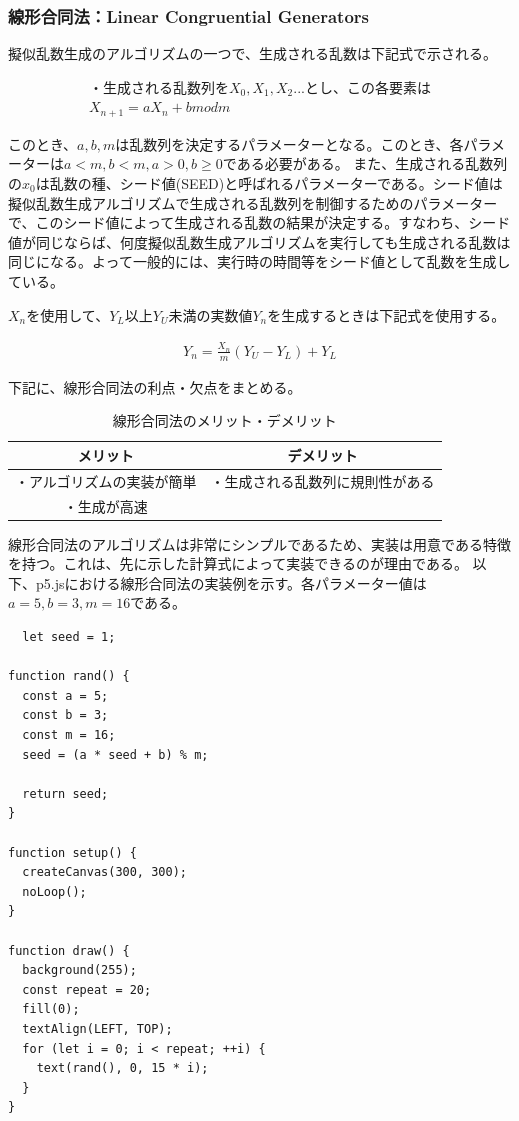 \documentclass[dvipdfmx]{jsarticle}
\begin{document}
\subsubsection{線形合同法：Linear Congruential Generators}
擬似乱数生成のアルゴリズムの一つで、生成される乱数は下記式で示される。
\begin{center}
  \begin{align*}
    ・生成される乱数列をX_{0}, X_{1}, X_{2}...とし、この各要素は\\
    X_{n+1} = aX_{n} + b mod m
  \end{align*}
\end{center}
このとき、$a, b, m$は乱数列を決定するパラメーターとなる。このとき、各パラメーターは$a < m, b < m, a > 0, b \geq 0$である必要がある。
また、生成される乱数列の$x_{0}$は乱数の種、シード値(SEED)と呼ばれるパラメーターである。シード値は擬似乱数生成アルゴリズムで生成される乱数列を制御するためのパラメーターで、このシード値によって生成される乱数の結果が決定する。すなわち、シード値が同じならば、何度擬似乱数生成アルゴリズムを実行しても生成される乱数は同じになる。よって一般的には、実行時の時間等をシード値として乱数を生成している。\par
$X_{n}$を使用して、$Y_{L}以上Y_{U}未満の実数値Y_{n}$を生成するときは下記式を使用する。
\begin{center}
  \begin{align*}
    Y_{n} = \frac{X_{n}}{m}(Y_{U}-Y_{L})+Y_{L}
  \end{align*}
\end{center}
下記に、線形合同法の利点・欠点をまとめる。
\begin{table}[H]
  \begin{center}
    \caption{線形合同法のメリット・デメリット}
    \begin{tabular}{|c|c|} \hline
      メリット & デメリット \\ \hline
      ・アルゴリズムの実装が簡単 & ・生成される乱数列に規則性がある\\
      ・生成が高速 & \\ \hline
    \end{tabular}
    \label{hyo01}
  \end{center}
\end{table}
線形合同法のアルゴリズムは非常にシンプルであるため、実装は用意である特徴を持つ。これは、先に示した計算式によって実装できるのが理由である。
以下、p5.jsにおける線形合同法の実装例を示す。各パラメーター値は$a = 5, b = 3, m = 16$である。
\begin{verbatim}
  let seed = 1;

function rand() {
  const a = 5;
  const b = 3;
  const m = 16;
  seed = (a * seed + b) % m;

  return seed;
}

function setup() {
  createCanvas(300, 300);
  noLoop();
}

function draw() {
  background(255);
  const repeat = 20;
  fill(0);
  textAlign(LEFT, TOP);
  for (let i = 0; i < repeat; ++i) {
    text(rand(), 0, 15 * i);
  }
}
\end{verbatim}
\end{document}

